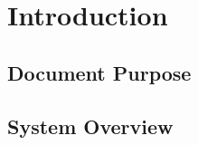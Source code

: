 \documentclass[../veristore_security_model.tex]{subfiles}
\begin{document}
\section{Introduction}


\subsection{Document Purpose}


\subsection{System Overview}

\end{document}
